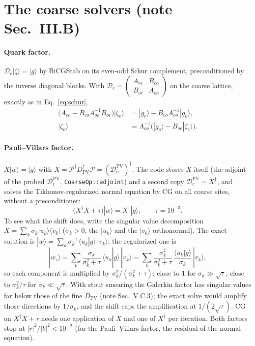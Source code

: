 \documentclass[11pt,a4paper]{article}
\numberwithin{equation}{section}
\newcommand{\dg}{^{\dagger}}
\newcommand{\Dpv}{D_{\mathrm{PV}}}
\newcommand{\Pro}{\mathcal P}
\newcommand{\Dc}{\mathcal D_{\mathrm c}}
\newcommand{\Dcpv}{\mathcal D_{\mathrm c}^{\mathrm{PV}}}
\newcommand{\code}[1]{\texttt{\small #1}}
\begin{document}
\section{The coarse solvers (note Sec.~III.B)}
\label{sec:coarsesolve}
\paragraph{Quark factor.} $\Dc|\zeta\rangle=|g\rangle$ by BiCGStab on its even-odd Schur complement,
preconditioned by the inverse diagonal blocks. With
$\Dc=\begin{pmatrix}A_{ee}&B_{eo}\\B_{oe}&A_{oo}\end{pmatrix}$ on the coarse lattice, exactly as in
Eq.~\eqref{eq:schur},
\begin{align}
\big(A_{ee}-B_{eo}A_{oo}^{-1}B_{oe}\big)|\zeta_e\rangle&=|g_e\rangle-B_{eo}A_{oo}^{-1}|g_o\rangle,\nonumber\\
|\zeta_o\rangle&=A_{oo}^{-1}\big(|g_o\rangle-B_{oe}|\zeta_e\rangle\big).
\end{align}
\paragraph{Pauli--Villars factor.} $X|w\rangle=|g\rangle$ with $X=\Pro\dg\Dpv\dg\Pro=(\Dcpv)\dg$. The code stores
$X$ itself (the adjoint of the probed $\Dcpv$, \code{CoarseOp::adjoint}) and a second copy $\Dcpv=X\dg$,
and solves the Tikhonov-regularized normal equation by CG on all coarse sites, without a preconditioner:
\begin{equation}
\big(X\dg X+\tau\big)|w\rangle=X\dg|g\rangle,\qquad \tau=10^{-3}.
\end{equation}
To see what the shift does, write the singular value decomposition
$X=\sum_k\sigma_k|u_k\rangle\langle v_k|$ ($\sigma_k>0$, the $|u_k\rangle$ and the $|v_k\rangle$
orthonormal). The exact solution is $|w\rangle=\sum_k\sigma_k^{-1}\langle u_k|g\rangle\,|v_k\rangle$;
the regularized one is
\begin{equation}
|w_\tau\rangle=\sum_k\frac{\sigma_k}{\sigma_k^2+\tau}\,\langle u_k|g\rangle\,|v_k\rangle
=\sum_k\frac{\sigma_k^2}{\sigma_k^2+\tau}\,\frac{\langle u_k|g\rangle}{\sigma_k}\,|v_k\rangle ,
\end{equation}
so each component is multiplied by $\sigma_k^2/(\sigma_k^2+\tau)$: close to $1$ for
$\sigma_k\gg\sqrt\tau$, close to $\sigma_k^2/\tau$ for $\sigma_k\ll\sqrt\tau$. With stout smearing
the Galerkin factor has singular values far below those of the fine $\Dpv$ (note Sec.~V.C.3); the
exact solve would amplify those directions by $1/\sigma_k$, and the shift caps the amplification at
$1/(2\sqrt\tau)$. CG on $X\dg X+\tau$ needs one application of $X$ and one of $X\dg$ per iteration.
Both factors stop at $|r|^2/|b|^2<10^{-2}$ (for the Pauli--Villars factor, the residual of the normal
equation).
\end{document}
